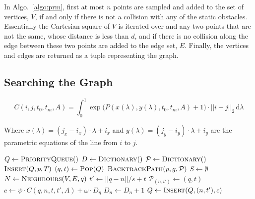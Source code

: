 
In Algo.~\ref{algo:prm}, first at most $n$ points are sampled and added to the
set of vertices, $V$, if and only if there is not a collision with any of the
static obstacles. Essentially the Cartesian square of $V$ is iterated over and
any two points that are not the same, whose distance is less than $d$, and if
there is no collision along the edge between these two points are added to the
edge set, $E$. Finally, the vertices and edges are returned as a tuple
representing the graph.

\subsection{Searching the Graph}


\begin{equation}
    C(i, j, t_0, t_m, A) = \int^1_0 \exp{\Big(
        P(x(\lambda), y(\lambda), t_0, t_m, A) + 1 \Big)
    } \cdot ||i - j||_{2} \,\mathrm{d}\lambda
    \label{eq:cost}
\end{equation}

Where $x(\lambda) = (j_x - i_x) \cdot \lambda + i_x$ and $y(\lambda) = (j_y -
i_y) \cdot \lambda + i_y$ are the parametric equations of the line from $i$ to
$j$.

\begin{algorithm}[ht]
    \caption{$\Function{SearchGraph}(V, E, R, A, p, g, T)$}
    \label{algo:search}
    \begin{algorithmic}[1]
        \setcounter{ALC@line}{0}
        \vspace*{1mm}
        \STATE $Q \leftarrow \Function{PriorityQueue}()$
        \STATE $D \leftarrow \Function{Dictionary}()$
        \STATE $\mathcal{P} \leftarrow \Function{Dictionary}()$
        \STATE $\Function{Insert}(Q, p, T)$
            \STATE $(q, t) \leftarrow \Function{Pop}(Q)$
                \RETURN $\Function{BacktrackPath}(p, g, \mathcal{P})$
            \ENDIF
            \STATE $S \leftarrow \emptyset$
            \STATE $N \leftarrow \Function{Neighbours}(V, E, q)$
                \STATE $t' \leftarrow ||q - n|| / s + t$
                \STATE $\mathcal{P}_{(n, t')} \leftarrow (q, t)$
                \STATE $c \leftarrow \psi \cdot C(q, n, t, t', A) + \omega
                    \cdot D_{\eta}$
                \STATE $D_{n} \leftarrow D_{n} + 1$
                \STATE $Q \leftarrow \Function{Insert}(Q, (n, t'), c)$
            \ENDFOR
        \ENDWHILE
    \end{algorithmic}
\end{algorithm}

